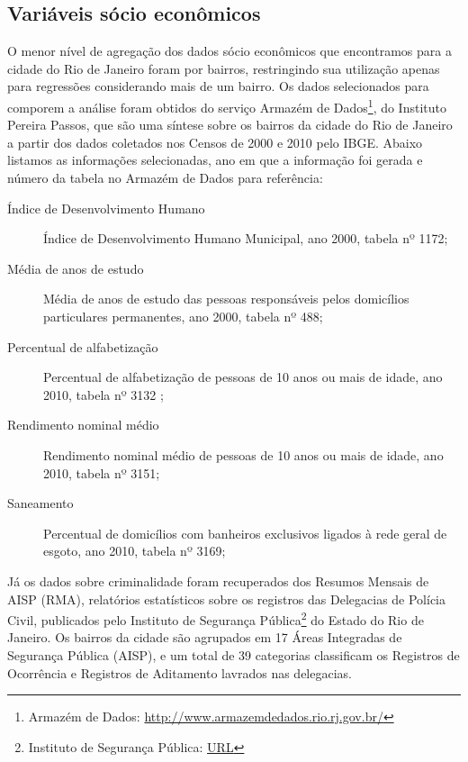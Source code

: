 \subsection{Variáveis sócio econômicos}

O menor nível de agregação dos dados sócio econômicos que encontramos para a cidade do Rio de Janeiro foram por bairros, restringindo sua utilização apenas para regressões considerando mais de um bairro. Os dados selecionados para comporem a análise foram obtidos do serviço Armazém de Dados\footnote{Armazém de Dados: \url{http://www.armazemdedados.rio.rj.gov.br/}}, do Instituto Pereira Passos, que são uma síntese sobre os bairros da cidade do Rio de Janeiro a partir dos dados coletados nos Censos de 2000 e 2010 pelo IBGE. Abaixo listamos as informações selecionadas, ano em que a informação foi gerada e número da tabela no Armazém de Dados para referência:

\begin{description}
\item[Índice de Desenvolvimento Humano] Índice de Desenvolvimento Humano Municipal, ano 2000, tabela nº 1172;

\item[Média de anos de estudo] Média de anos de estudo das pessoas responsáveis pelos domicílios particulares permanentes, ano 2000, tabela nº 488;

\item[Percentual de alfabetização] Percentual de alfabetização de pessoas de 10 anos ou mais de idade, ano 2010, tabela nº 3132 ;

\item[Rendimento nominal médio] Rendimento nominal médio de pessoas de 10 anos ou mais de idade, ano 2010, tabela nº 3151;

\item[Saneamento] Percentual de domicílios com banheiros exclusivos ligados à rede geral de esgoto, ano 2010, tabela nº 3169;
\end{description}

Já os dados sobre criminalidade foram recuperados dos Resumos Mensais de AISP (RMA), relatórios estatísticos sobre os registros das Delegacias de Polícia Civil, publicados pelo Instituto de Segurança Pública\footnote{Instituto de Segurança Pública: \url{URL}} do Estado do Rio de Janeiro. Os bairros da cidade são agrupados em 17 Áreas Integradas de Segurança Pública (AISP), e um total de 39 categorias classificam os Registros de Ocorrência e Registros de Aditamento lavrados nas delegacias. 

